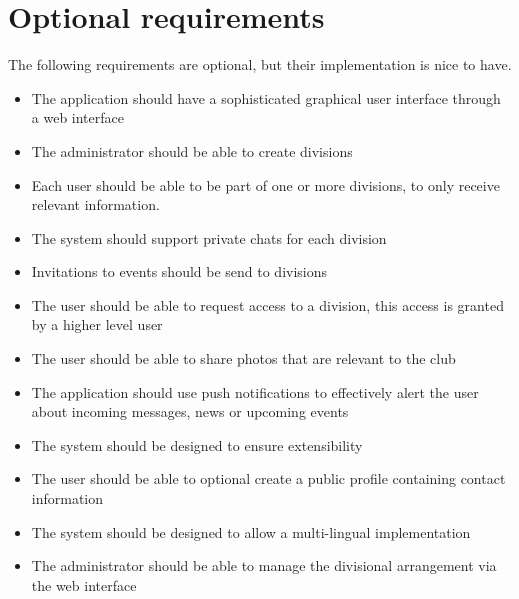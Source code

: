 \section{Optional requirements}
The following requirements are optional, but their implementation is nice to have.
\begin{itemize}
\item The application should have a sophisticated graphical user interface through a web interface
\item The administrator should be able to create divisions
\item Each user should be able to be part of one or more divisions, to only receive relevant information.
\item The system should support private chats for each division
\item Invitations to events should be send to divisions
\item The user should be able to request access to a division, this access is granted by a higher level user
\item The user should be able to share photos that are relevant to the club
\item The application should use push notifications to effectively alert the user about incoming messages, news or upcoming events
\item The system should be designed to ensure extensibility
\item The user should be able to optional create a public profile containing contact information
\item The system should be designed to allow a multi-lingual implementation
\item The administrator should be able to manage the divisional arrangement via the web interface
\end{itemize}

